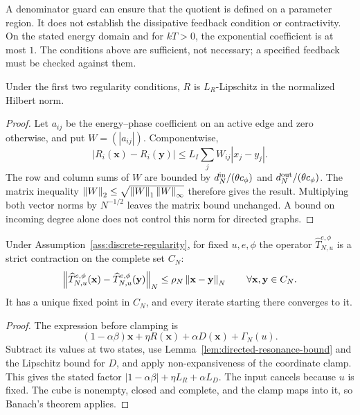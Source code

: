 \begin{remark}
A denominator guard can ensure that the quotient is defined on a parameter region. It does not establish the dissipative feedback condition or contractivity. On the stated energy domain and for $kT>0$, the exponential coefficient is at most $1$. The conditions above are sufficient, not necessary; a specified feedback must be checked against them.
\end{remark}

\begin{lemma}\label{lem:directed-resonance-bound}
Under the first two regularity conditions, $R$ is $L_R$-Lipschitz in the normalized Hilbert norm.
\end{lemma}

\begin{proof}
Let $a_{ij}$ be the energy--phase coefficient on an active edge and zero otherwise, and put $W=(|a_{ij}|)$. Componentwise,
\[
|R_i(\mathbf{x})-R_i(\mathbf{y})|
\leq L_I\sum_j W_{ij}|x_j-y_j|.
\]
The row and column sums of $W$ are bounded by $d_N^{\rm in}/(\theta c_\phi)$ and $d_N^{\rm out}/(\theta c_\phi)$. The matrix inequality $\left\lVert W \right\rVert_2\leq\sqrt{\left\lVert W \right\rVert_1\left\lVert W \right\rVert_\infty}$ therefore gives the result. Multiplying both vector norms by $N^{-1/2}$ leaves the matrix bound unchanged. A bound on incoming degree alone does not control this norm for directed graphs.
\end{proof}

\begin{theorem}\label{thm:discrete-contraction}
Under Assumption~\ref{ass:discrete-regularity}, for fixed $u,e,\phi$ the operator $\widehat T_{N,u}^{e,\phi}$ is a strict contraction on the complete set $C_N$:
\[
\left\lVert \widehat T_{N,u}^{e,\phi}(\mathbf{x})-\widehat T_{N,u}^{e,\phi}(\mathbf{y}) \right\rVert_N
\le
\rho_N\left\lVert \mathbf{x}-\mathbf{y} \right\rVert_N
\qquad
\forall \mathbf{x},\mathbf{y}\in C_N.
\]
It has a unique fixed point in $C_N$, and every iterate starting there converges to it.
\end{theorem}

\begin{proof}
The expression before clamping is
\[
(1-\alpha\beta)\mathbf{x}+\eta R(\mathbf{x})+\alpha D(\mathbf{x})+\Gamma_N(u).
\]
Subtract its values at two states, use Lemma~\ref{lem:directed-resonance-bound} and the Lipschitz bound for $D$, and apply non-expansiveness of the coordinate clamp. This gives the stated factor $|1-\alpha\beta|+\eta L_R+\alpha L_D$. The input cancels because $u$ is fixed. The cube is nonempty, closed and complete, and the clamp maps into it, so Banach's theorem applies.
\end{proof}

